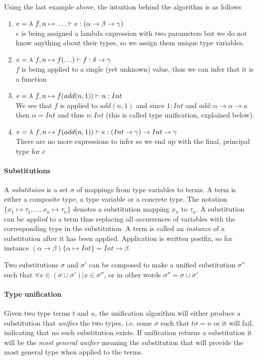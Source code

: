Using the last example above, the intuition behind the algorithm is as follows
\begin{enumerate}
\item $e = \lambda{} \ f, n \mapsto{} \ldots \vdash e: (\alpha \to \beta \to \gamma)$ \\
  $e$ is being assigned a lambda expression with two parameters but we do not know anything about their types, so we assign them unique type variables.
\item $e = \lambda{} \ f, n \mapsto{} f(\ldots) \vdash f: \delta \to \gamma$ \\
  $f$ is being applied to a single (yet unknown) value, thus we can infer that it is a function
\item $e = \lambda{} \ f, n \mapsto{} f(add(n, 1)) \vdash n : Int$ \\
  We see that $f$ is applied to $add(n, 1)$ and since $1: Int$ and $add:\alpha \to \alpha \to a$ then $\alpha = Int$ and thus $n:Int$ (this is called type unification, explained below).
\item $e = \lambda{} \ f, n \mapsto{} f(add(n, 1)) \vdash e : (Int \to \gamma) \to Int \to \gamma$ \\
  There are no more expressions to infer so we end up with the final, principal type for $e$
\end{enumerate}

\paragraph{Substitutions}
A \emph{substituion} is a set $\sigma$ of mappings from type variables to terms. A term is either a composite type, a type variable or a concrete type. The notation $\{ x_1 \mapsto \tau_1, \ldots, x_n \mapsto \tau_n \}$ denotes a substitution mapping $x_n$ to $\tau_n$. A substitution can be \emph{applied} to a term thus replacing all occurrences of variables with the corresponding type in the substitution. A term is called an \emph{instance} of a substitution after it has been applied\cite[sec. 1]{wiki-unif14}. Application is written postfix, so for instance $(\alpha \to \beta) \{\alpha \mapsto Int\} = Int \to \beta$.

Two substitutions $\sigma$ and $\sigma'$ can be composed to make a unified substitution $\sigma''$ such that $\forall x \in (\sigma \cup \sigma') | x \in \sigma''$, or in other words $\sigma'' = \sigma \cup \sigma'$

\paragraph{Type unification}
Given two type terms $t$ and $u$, the unification algorithm will either produce a substitution that \emph{unifies} the two types, i.e. some $\sigma$ such that $t\sigma = u$ or it will fail, indicating that no such substitution exists. If unification returns a substitution it will be the \emph{most general unifier} meaning the substitution that will provide the most general type when applied to the terms.

